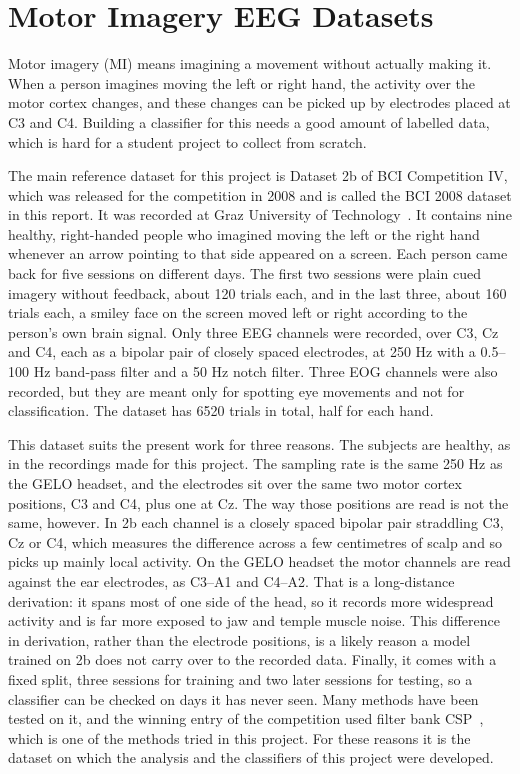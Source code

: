 \section{Motor Imagery EEG Datasets}
\label{sec:mi_datasets}

Motor imagery (MI) means imagining a movement without actually making it. When a person
imagines moving the left or right hand, the activity over the motor cortex changes, and
these changes can be picked up by electrodes placed at C3 and C4. Building a classifier for
this needs a good amount of labelled data, which is hard for a student project to collect
from scratch.

The main reference dataset for this project is Dataset 2b of BCI Competition IV, which was
released for the competition in 2008 and is called the BCI 2008 dataset in this report. It
was recorded at Graz University of Technology~\cite{leeb2007virtual,
tangermann2012review}. It contains nine healthy, right-handed people who imagined moving
the left or the right hand whenever an arrow pointing to that side appeared on a screen.
Each person came back for five sessions on different days. The first two sessions were
plain cued imagery without feedback, about 120 trials each, and in the last three, about
160 trials each, a smiley face on the screen moved left or right according to the person's
own brain signal. Only three EEG channels were recorded, over C3, Cz and C4, each as a
bipolar pair of closely spaced electrodes, at 250 Hz with a 0.5--100 Hz band-pass filter
and a 50 Hz notch filter. Three EOG channels were also recorded, but they are meant only
for spotting eye movements and not for classification. The dataset has 6520 trials in
total, half for each hand.

This dataset suits the present work for three reasons. The subjects are healthy, as in the
recordings made for this project. The sampling rate is the same 250 Hz as the GELO headset,
and the electrodes sit over the same two motor cortex positions, C3 and C4, plus one at
Cz. The way those positions are read is not the same, however. In 2b each channel is a
closely spaced bipolar pair straddling C3, Cz or C4, which measures the difference across
a few centimetres of scalp and so picks up mainly local activity. On the GELO headset the
motor channels are read against the ear electrodes, as C3--A1 and C4--A2. That is a
long-distance derivation: it spans most of one side of the head, so it records more
widespread activity and is far more exposed to jaw and temple muscle noise. This
difference in derivation, rather than the electrode positions, is a likely reason a model
trained on 2b does not carry over to the recorded data. Finally, it comes with a fixed split, three sessions for training and two later
sessions for testing, so a classifier can be checked on days it has never seen. Many
methods have been tested on it, and the winning entry of the competition used filter bank
CSP~\cite{ang2012fbcsp}, which is one of the methods tried in this project. For these
reasons it is the dataset on which the analysis and the classifiers of this project were
developed.

